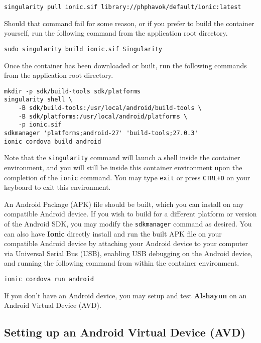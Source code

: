 \documentclass[12pt]{report}
\begin{document}
\begin{verbatim}
singularity pull ionic.sif library://phphavok/default/ionic:latest
\end{verbatim}

Should that command fail for some reason, or if you prefer to build the
container yourself, run the following command from the application root
directory.

\begin{verbatim}
sudo singularity build ionic.sif Singularity
\end{verbatim}

Once the container has been downloaded or built, run the following commands from
the application root directory.

\begin{verbatim}
mkdir -p sdk/build-tools sdk/platforms
singularity shell \
    -B sdk/build-tools:/usr/local/android/build-tools \
    -B sdk/platforms:/usr/local/android/platforms \
    -p ionic.sif
sdkmanager 'platforms;android-27' 'build-tools;27.0.3'
ionic cordova build android
\end{verbatim}

Note that the \texttt{singularity} command will launch a shell inside the
container environment, and you will still be inside this container environment
upon the completion of the \texttt{ionic} command. You may type \texttt{exit} or
press \texttt{CTRL+D} on your keyboard to exit this environment.

An Android Package (APK) file should be built, which you can install on any
compatible Android device. If you wish to build for a different platform or
version of the Android SDK, you may modify the \texttt{sdkmanager} command as
desired. You can also have \textbf{Ionic} directly install and run the built APK
file on your compatible Android device by attaching your Android device to your
computer via Universal Serial Bus (USB), enabling USB debugging on the Android
device, and running the following command from within the container environment.

\begin{verbatim}
ionic cordova run android
\end{verbatim}

If you don't have an Android device, you may setup and test \textbf{Alshayun} on
an Android Virtual Device (AVD).

        \subsection{Setting up an Android Virtual Device (AVD)}
\end{document}
